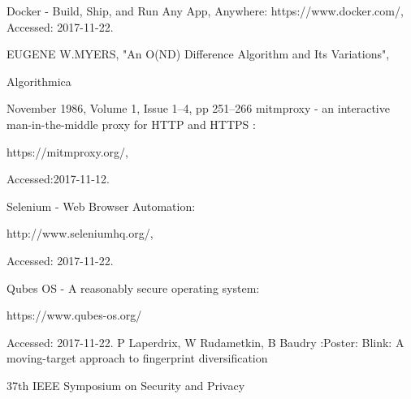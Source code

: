 \documentclass[a4paper,twocolumn,10pt]{jarticle}
\begin{document}
\begin{thebibliography}{1}

Docker - Build, Ship, and Run Any App, Anywhere: https://www.docker.com/, Accessed: 2017-11-22.

EUGENE W.MYERS, "An O(ND) Difference Algorithm and Its Variations",

Algorithmica

November 1986, Volume 1, Issue 1–4, pp 251–266 
mitmproxy - an interactive man-in-the-middle proxy for HTTP and HTTPS : 

https://mitmproxy.org/, 

Accessed:2017-11-12.

 Selenium - Web Browser Automation:
 
  http://www.seleniumhq.org/,
  
   Accessed: 2017-11-22.
 
Qubes OS - A reasonably secure operating system:

https://www.qubes-os.org/
 
Accessed: 2017-11-22.
P Laperdrix, W Rudametkin, B Baudry :Poster: Blink: A moving-target approach to fingerprint diversification 

37th IEEE Symposium on Security and Privacy
\end{thebibliography}
\end{document}
